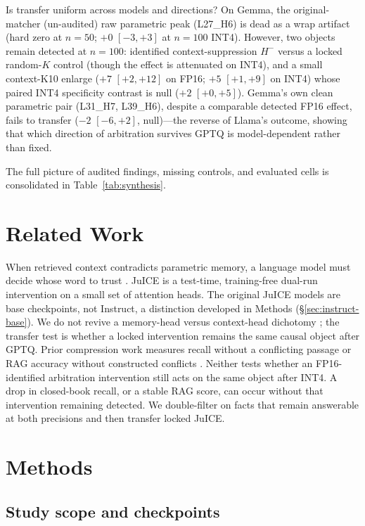 \documentclass{article} %
\begin{document}
Is transfer uniform across models and directions? On Gemma, the original-matcher (un-audited) raw parametric peak (L27\_H6) is dead as a wrap artifact (hard zero at $n{=}50$; $+0$ $[-3,+3]$ at $n{=}100$ INT4). However, two objects remain detected at $n{=}100$: identified context-suppression $H^{-}$ versus a locked random-$K$ control (though the effect is attenuated on INT4), and a small context-K10 enlarge ($+7$ $[+2,+12]$ on FP16; $+5$ $[+1,+9]$ on INT4) whose paired INT4 specificity contrast is null ($+2$ $[+0,+5]$). Gemma's own clean parametric pair (L31\_H7, L39\_H6), despite a comparable detected FP16 effect, fails to transfer ($-2$ $[-6,+2]$, null)---the reverse of Llama's outcome, showing that which direction of arbitration survives GPTQ is model-dependent rather than fixed.

The full picture of audited findings, missing controls, and evaluated cells is consolidated in Table~\ref{tab:synthesis}.

\section{Related Work}
\label{sec:related}

When retrieved context contradicts parametric memory, a language model must decide whose word to trust \citep{xie2024adaptive}. JuICE \citep{li2025taming} is a test-time, training-free dual-run intervention on a small set of attention heads. The original JuICE models are base checkpoints, not Instruct, a distinction developed in Methods (\S\ref{sec:instruct-base}). We do not revive a memory-head versus context-head dichotomy \citep{jin2024tug}; the transfer test is whether a locked intervention remains the same causal object after GPTQ. Prior compression work measures recall without a conflicting passage \citep{wang2026compressed} or RAG accuracy without constructed conflicts \citep{yazan2024rag}. Neither tests whether an FP16-identified arbitration intervention still acts on the same object after INT4. A drop in closed-book recall, or a stable RAG score, can occur without that intervention remaining detected. We double-filter on facts that remain answerable at both precisions and then transfer locked JuICE.

\section{Methods}
\label{sec:methods}

\subsection{Study scope and checkpoints}
\end{document}
